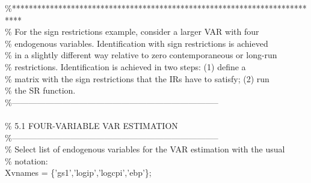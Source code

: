 \hspace{1mm}\textcolor{matlabgreen}{\%**************************************************************************  }\\ 
\hspace{1mm}\textcolor{matlabgreen}{\% For the sign restrictions example, consider a larger VAR  with four  }\\ 
\hspace{1mm}\textcolor{matlabgreen}{\% endogenous variables. Identification with sign restrictions is achieved  }\\ 
\hspace{1mm}\textcolor{matlabgreen}{\% in a slightly different way relative to zero contemporaneous or long-run  }\\ 
\hspace{1mm}\textcolor{matlabgreen}{\% restrictions. Identification is achieved in two steps: (1) define a  }\\ 
\hspace{1mm}\textcolor{matlabgreen}{\% matrix with the sign restrictions that the IRs have to satisfy; (2) run  }\\ 
\hspace{1mm}\textcolor{matlabgreen}{\% the SR function.  }\\ 
\hspace{1mm}\textcolor{matlabgreen}{\%--------------------------------------------------------------------------  }\\ 
\hspace{1mm} \\ 
\hspace{1mm}\textcolor{matlabgreen}{\% 5.1 FOUR-VARIABLE VAR ESTIMATION }\\ 
\hspace{1mm}\textcolor{matlabgreen}{\%--------------------------------------------------------------------------  }\\ 
\hspace{1mm}\textcolor{matlabgreen}{\% Select list of endogenous variables \textcolor{matlabblue}{for} the VAR estimation with the usual  }\\ 
\hspace{1mm}\hspace{5mm} \textcolor{matlabgreen}{\% notation: }\\ 
\hspace{1mm}\hspace{5mm} Xvnames      = \{\textcolor{matlabpurple}{'gs1'},\textcolor{matlabpurple}{'logip'},\textcolor{matlabpurple}{'logcpi'},\textcolor{matlabpurple}{'ebp'}\}; \\ 
